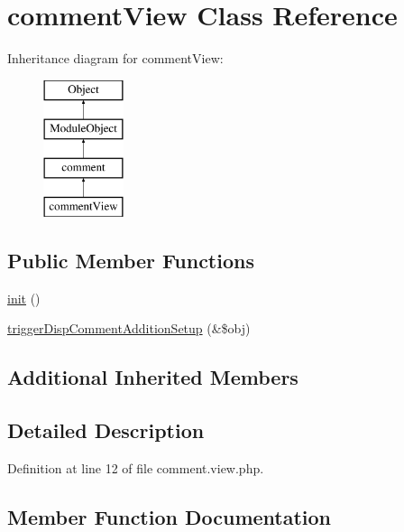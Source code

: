 \hypertarget{classcommentView}{}\section{comment\+View Class Reference}
\label{classcommentView}
Inheritance diagram for comment\+View\+:\begin{figure}[H]
\begin{center}
\leavevmode
\includegraphics[height=4.000000cm]{classcommentView}
\end{center}
\end{figure}
\subsection*{Public Member Functions}
\begin{DoxyCompactItemize}
\item 
\hyperlink{classcommentView_a07590a352da4831233828e9521812419}{init} ()
\item 
\hyperlink{classcommentView_ad2504c48d3411458dcdd88d1d681aba7}{trigger\+Disp\+Comment\+Addition\+Setup} (\&\$obj)
\end{DoxyCompactItemize}
\subsection*{Additional Inherited Members}


\subsection{Detailed Description}


Definition at line 12 of file comment.\+view.\+php.



\subsection{Member Function Documentation}
\hypertarget{classcommentView_a07590a352da4831233828e9521812419}{}\label{classcommentView_a07590a352da4831233828e9521812419} 
